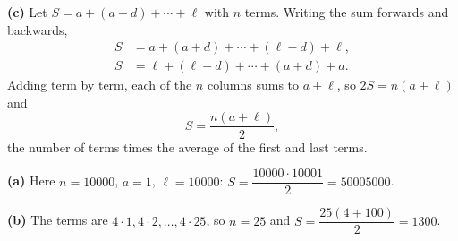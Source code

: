 \textbf{(c)} Let $S=a+(a+d)+\cdots+\ell$ with $n$ terms. Writing the sum forwards and backwards,
\[
\begin{aligned}
S&=a+(a+d)+\cdots+(\ell-d)+\ell,\\
S&=\ell+(\ell-d)+\cdots+(a+d)+a .
\end{aligned}
\]
Adding term by term, each of the $n$ columns sums to $a+\ell$, so $2S=n(a+\ell)$ and
\[
S=\dfrac{n(a+\ell)}{2},
\]
the number of terms times the average of the first and last terms.

\textbf{(a)} Here $n=10000$, $a=1$, $\ell=10000$: $S=\dfrac{10000\cdot10001}{2}=\boxed{50005000}$.

\textbf{(b)} The terms are $4\cdot1,4\cdot2,\dots,4\cdot25$, so $n=25$ and $S=\dfrac{25(4+100)}{2}=\boxed{1300}$.
